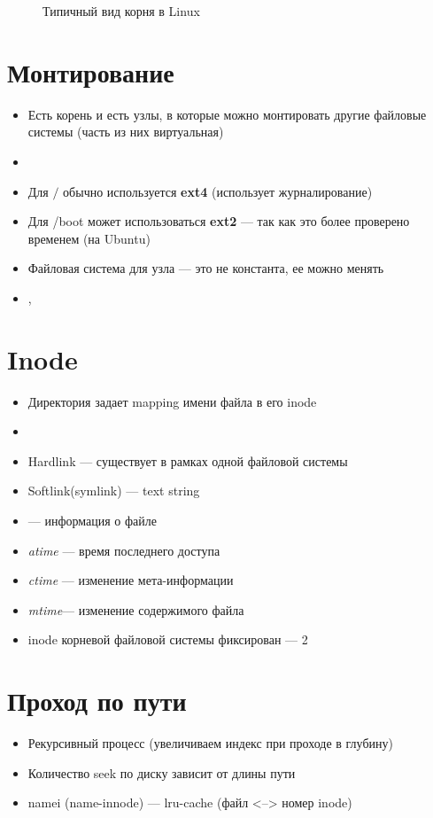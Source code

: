 \documentclass[../../lectures.tex]{subfiles}
\begin{document}
\begin{figure}[H]
\begin{minipage}[c]{0.37\linewidth}
\caption{Типичный вид корня в Linux}
\end{minipage}
\end{figure}

\section{Монтирование}
\begin{itemize}
    \item Есть корень и есть узлы, в которые можно монтировать другие файловые системы (часть из них виртуальная)
    \item {}
    \item Для $/$ обычно используется \textbf{ext4} (использует журналирование)
    \item Для /boot может использоваться \textbf{ext2} --- так как это более проверено временем (на Ubuntu)
    \item Файловая система для узла --- это не константа, ее можно менять
    \item {}, 
\end{itemize}

\section{Inode}
\begin{itemize}
    \item Директория задает mapping имени файла в его inode
    \item {}
    \item Hardlink --- существует в рамках одной файловой системы
    \item Softlink(symlink) --- text string
    \item {} --- информация о файле
    \item \emph{atime} --- время последнего доступа
    \item \emph{ctime} --- изменение мета-информации
    \item \emph{mtime}--- изменение содержимого файла
    \item inode корневой файловой системы фиксирован --- 2
\end{itemize}

\section{Проход по пути}
\begin{itemize}
    \item Рекурсивный процесс (увеличиваем индекс при проходе в глубину)
    \item Количество seek по диску зависит от длины пути
    \item namei (name-innode) --- lru-cache (файл <--> номер inode)
\end{itemize}
\end{document}
